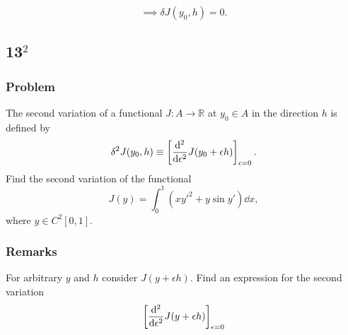 \documentclass[12pt,twoside]{article}
\begin{document}
\begin{equation*}
  \boxed{\implies \delta J(y_0,h) = 0.}
\end{equation*}

\subsection{13$^2$}
\subsubsection*{Problem}
The second variation of a functional $J:A\rightarrow\mathbb{R}$ at $y_0\in A$ in
the direction $h$ is defined by
\begin{equation}
  \label{eq:4.2.13-problem}
  \delta^2J(y_0,h)\equiv \left[\od[2]{}{\epsilon} J(y_0+\epsilon h)\right]_{\epsilon=0}.
\end{equation}
Find the second variation of the functional
\begin{equation}
  \label{eq:4.2.13-problem-second-variation}
  J(y)=\int_0^1(xy'^2+y\sin y')\dd{x},
\end{equation}
where $y\in C^2[0,1]$.

\subsubsection*{Remarks}
For arbitrary $y$ and $h$ consider $J(y+\epsilon h)$. Find an expression for the
second variation $${\left[\od[2]{}{\epsilon} J(y+\epsilon h)\right]}_{\epsilon=0}$$
\end{document}
